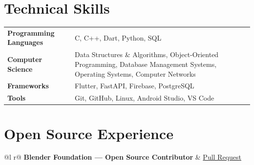 \documentclass[a4paper,12pt]{article}
\begin{document}
\section{Technical Skills}

\begin{tabularx}{\linewidth}{ @{}l X@{} }
\textbf{Programming Languages} & C, C++, Dart, Python, SQL \\[6pt]

\textbf{Computer Science} & Data Structures \& Algorithms, Object-Oriented Programming, Database Management Systems, Operating Systems, Computer Networks \\[6pt]

\textbf{Frameworks} & Flutter, FastAPI, Firebase, PostgreSQL \\[6pt]

\textbf{Tools} & Git, GitHub, Linux, Android Studio, VS Code \\
\end{tabularx}

\section{Open Source Experience}

\begin{tabularx}{\linewidth}{ @{}l r@{} }
\textbf{Blender Foundation — Open Source Contributor} &
\hfill \href{https://projects.blender.org/blender/blender/pulls/159597}{Pull Request} \\[3.75pt]
 \\
\end{tabularx}

\end{document}
